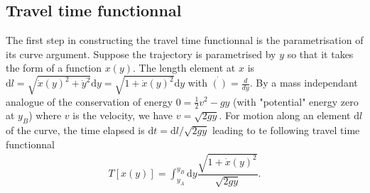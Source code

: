 \documentclass[10pt, a4paper]{article}
\begin{document}
\subsection{Travel time functionnal}
The first step in constructing the travel time functionnal is the parametrisation of its curve argument.  Suppose the trajectory is parametrised by $y$ so that it takes the form of a function $x(y)$. The length element at $x$ is $\text{d} l = \sqrt{\dot{x}(y)^2 + \dot{y}^2} \text{d} y = \sqrt{1 + \dot{x}(y)^2} \text{d} y$ with $\dot{()} = \frac{d}{dy}$. By a mass independant analogue of the conservation of energy $0 = \frac{1}{2} v^2-g y$ (with "potential" energy zero at $y_B$) where $v$ is the velocity, we have $v = \sqrt{2gy}$. For motion along an element $\text{d}l$ of the curve, the time elapsed is $\text{d}t = \text{d}l/\sqrt{2gy}$ leading to te following travel time functionnal 
\begin{align*}
    T[x(y)] = \int_{y_A}^{y_B} \text{d} y \dfrac{\sqrt{1 + \dot{x}(y)^2}}{\sqrt{2gy}}. 
\end{align*}


%
\end{document}
